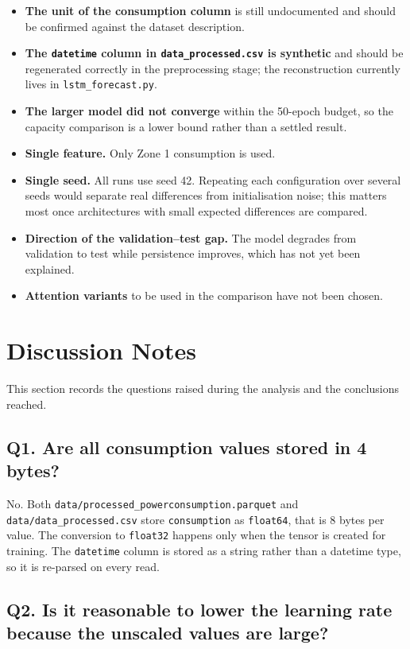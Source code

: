 \documentclass[11pt,a4paper]{article}
\begin{document}
\begin{itemize}
  \item \textbf{The unit of the consumption column} is still undocumented and should be confirmed
        against the dataset description.
  \item \textbf{The \texttt{datetime} column in \texttt{data\_processed.csv} is synthetic} and
        should be regenerated correctly in the preprocessing stage; the reconstruction currently
        lives in \texttt{lstm\_forecast.py}.
  \item \textbf{The larger model did not converge} within the 50-epoch budget, so the capacity
        comparison is a lower bound rather than a settled result.
  \item \textbf{Single feature.} Only Zone 1 consumption is used.
  \item \textbf{Single seed.} All runs use seed 42. Repeating each configuration over several seeds
        would separate real differences from initialisation noise; this matters most once
        architectures with small expected differences are compared.
  \item \textbf{Direction of the validation--test gap.} The model degrades from validation to test
        while persistence improves, which has not yet been explained.
  \item \textbf{Attention variants} to be used in the comparison have not been chosen.
\end{itemize}


\section{Discussion Notes}

This section records the questions raised during the analysis and the conclusions reached.

\subsection*{Q1. Are all consumption values stored in 4 bytes?}

No. Both \texttt{data/processed\_powerconsumption.parquet} and \texttt{data/data\_processed.csv}
store \texttt{consumption} as \texttt{float64}, that is 8 bytes per value. The conversion to
\texttt{float32} happens only when the tensor is created for training. The \texttt{datetime}
column is stored as a string rather than a datetime type, so it is re-parsed on every read.

\subsection*{Q2. Is it reasonable to lower the learning rate because the unscaled values are large?}
\end{document}
